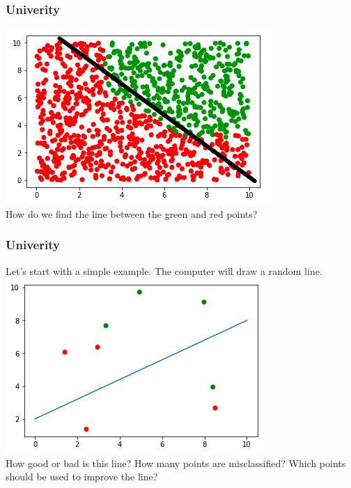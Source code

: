 \begin{frame}[fragile]
  \frametitle{Univerity}
  \includegraphics[scale=0.4]{img/uni_data_2}\\
  \vspace{3mm}
  How do we find the line between the green and red points?
\end{frame}

\begin{frame}[fragile]
  \frametitle{Univerity}
  Let's start with a simple example. The computer will draw a random line.\\
  \vspace{3mm}
  \includegraphics[scale=0.4]{img/uni_data_3}\\
  \vspace{3mm}
  How good or bad is this line? How many points are misclassified? Which points
  should be used to improve the line?
\end{frame}

